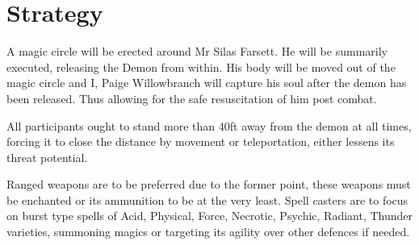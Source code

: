 \documentclass{article}
\begin{document}
    \section*{Strategy}

    A magic circle will be erected around Mr Silas Farsett. He will be summarily executed, releasing the Demon from within. 
    His body will be moved out of the magic circle and I, Paige Willowbranch will capture his soul after the demon has been released. Thus allowing for the safe resuscitation of him post combat. 

    All participants ought to stand more than 40ft away from the demon at all times, forcing it to close the distance by movement or teleportation, either lessens its threat potential.

    Ranged weapons are to be preferred due to the former point, these weapons must be enchanted or its ammunition to be at the very least. Spell casters are to focus on burst type spells of Acid, Physical, Force, Necrotic, Psychic, Radiant, Thunder varieties, summoning magics or targeting its agility over other defences if needed. 
\end{document}
